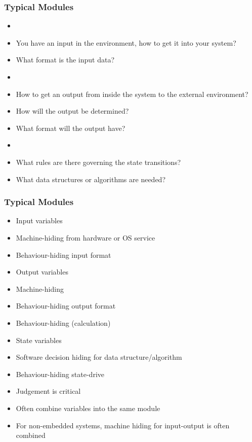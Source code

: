 \documentclass[t,12pt,numbers,fleqn]{beamer}
\begin{document}
\begin{frame}
\frametitle{Typical Modules \cite{HoffmanAndStrooper1995}}

\begin{itemize}
\item {}
\bi
\item You have an input in the environment, how to get it into your system?
\item What format is the input data?
\ei
\item {}
\bi
\item How to get an output from inside the system to the external environment?
\item How will the output be determined?
\item What format will the output have?
\ei
\item {}
\bi
\item What rules are there governing the state transitions?
\item What data structures or algorithms are needed?
\ei
\end{itemize}

\end{frame}


\begin{frame}
\frametitle{Typical Modules \cite{HoffmanAndStrooper1995}}

\begin{itemize}
\item Input variables
\bi
\item Machine-hiding from hardware or OS service
\item Behaviour-hiding input format
\ei
\item Output variables
\bi
\item Machine-hiding
\item Behaviour-hiding output format
\item Behaviour-hiding (calculation)
\ei
\item State variables
\bi
\item Software decision hiding for data structure/algorithm
\item Behaviour-hiding state-drive
\ei
\item Judgement is critical
\item Often combine variables into the same module
\item For non-embedded systems, machine hiding for input-output is often
  combined
\end{itemize}

\end{frame}
\end{document}
